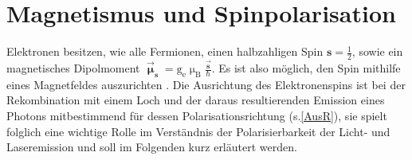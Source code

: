 \section{Magnetismus und Spinpolarisation}
Elektronen besitzen, wie alle Fermionen, einen halbzahligen Spin  $\textbf{s}= \frac{1}{2}$, sowie ein magnetisches Dipolmoment $\vec{\boldsymbol{\upmu}}_{\textbf{s}}=\text{g}_\text{e}\upmu_\text{B}\frac{\vec{\textbf{s}}}{\hbar}$. Es ist also möglich, den Spin mithilfe eines Magnetfeldes auszurichten \cite{Gross.2014}. Die Ausrichtung des Elektronenspins ist bei der Rekombination mit einem Loch und der daraus resultierenden Emission eines Photons mitbestimmend für dessen Polarisationsrichtung (s.\autoref{AusR}), sie spielt folglich eine wichtige Rolle im Verständnis der Polarisierbarkeit der Licht- und Laseremission und soll im Folgenden kurz erläutert werden.
